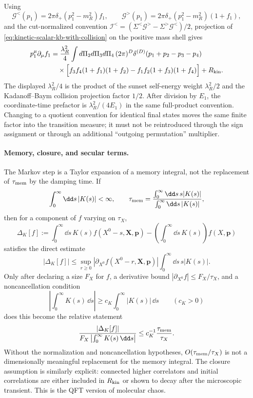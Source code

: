 Using
\[
  \mathcal G^<(p_1)=2\pi\delta_+(p_1^2-m_R^2)f_1,\qquad
  \mathcal G^>(p_1)=2\pi\delta_+(p_1^2-m_R^2)(1+f_1),
\]
and the cut-normalized convention
\(\mathcal I^<=(\mathcal\Sigma^<\mathcal G^>
-\mathcal\Sigma^>\mathcal G^<)/2\), projection of
\eqref{eq:kinetic-scalar-kb-with-collision} on the positive mass shell gives
\begin{align}
  p_1^\mu\partial_\mu f_1
  &=
  \frac{\lambda_R^2}{4}
  \int d\Pi_2d\Pi_3d\Pi_4\,
  (2\pi)^D\delta^{(D)}(p_1+p_2-p_3-p_4)
  \nonumber\\
  &\quad\times
  \Big[
  f_3f_4(1+f_1)(1+f_2)
  -
  f_1f_2(1+f_3)(1+f_4)
  \Big]
  +R_{\rm kin}.
  \label{eq:kinetic-scalar-derived-boltzmann-kernel}
\end{align}
The displayed \(\lambda_R^2/4\) is the product of the sunset
self-energy weight \(\lambda_R^2/2\) and the Kadanoff--Baym collision
projection factor \(1/2\).  After division by \(E_1\), the coordinate-time
prefactor is \(\lambda_R^2/(4E_1)\) in the same full-product convention.
Changing to a quotient convention for identical final states moves the same
finite factor into the transition measure; it must not be reintroduced
through the sign assignment or through an additional ``outgoing
permutation'' multiplier.

\paragraph{Memory, closure, and secular terms.}
The Markov step is a Taylor expansion of a memory integral, not the
replacement of \(\tau_{\rm mem}\) by the damping time.  If
\[
  \int_0^\infty\dd s\, |K(s)| <\infty,\qquad
  \tau_{\rm mem}
  =
  \frac{\int_0^\infty\dd s\,s|K(s)|}{\int_0^\infty\dd s\,|K(s)|},
\]
then for a component of \(f\) varying on \(\tau_X\),
\begin{equation}
  \Delta_K[f]
  :=
  \int_0^\infty\dd s\,K(s)f(X^0-s,\mathbf X,\mathbf p)
  -
  \left(\int_0^\infty\dd s\,K(s)\right)f(X,\mathbf p)
  \label{eq:kinetic-markov-memory-difference}
\end{equation}
satisfies the direct estimate
\begin{equation}
  |\Delta_K[f]|
  \le
  \sup_{r\ge0}|\partial_{X^0}f(X^0-r,\mathbf X,\mathbf p)|
  \int_0^\infty\dd s\,s|K(s)|.
  \label{eq:kinetic-markov-memory-expansion}
\end{equation}
Only after declaring a size \(F_X\) for \(f\), a derivative bound
\(|\partial_{X^0}f|\le F_X/\tau_X\), and a noncancellation condition
\[
  \left|\int_0^\infty K(s)\,\dd s\right|
  \ge
  c_K\int_0^\infty |K(s)|\,\dd s
  \qquad(c_K>0)
\]
does this become the relative statement
\[
  \frac{|\Delta_K[f]|}
       {F_X\left|\int_0^\infty K(s)\,\dd s\right|}
  \le
  c_K^{-1}\frac{\tau_{\rm mem}}{\tau_X}.
\]
Without the normalization and noncancellation hypotheses,
\(O(\tau_{\rm mem}/\tau_X)\) is not a dimensionally meaningful replacement
for the memory integral.
The closure assumption is similarly explicit: connected higher correlators and
initial correlations are either included in \(R_{\rm kin}\) or shown to decay
after the microscopic transient.  This is the QFT version of molecular chaos.

